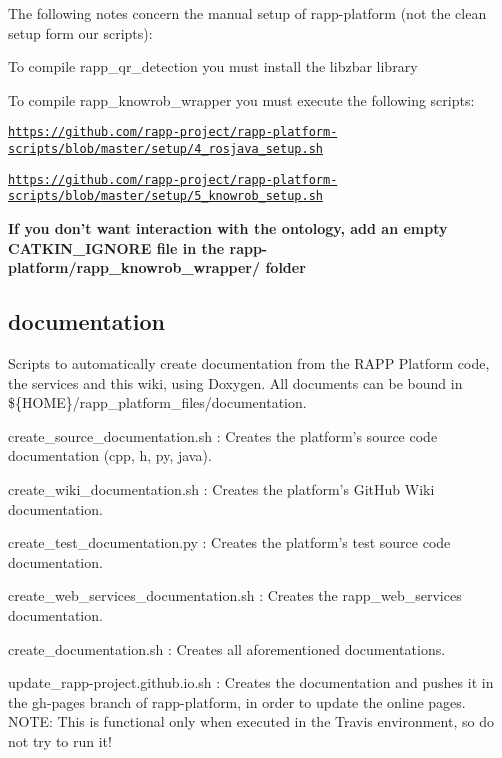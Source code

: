The following notes concern the manual setup of rapp-\/platform (not the clean setup form our scripts)\-:


\begin{DoxyItemize}
\item To compile {\ttfamily rapp\-\_\-qr\-\_\-detection} you must install the {\ttfamily libzbar} library
\item To compile {\ttfamily rapp\-\_\-knowrob\-\_\-wrapper} you must execute the following scripts\-:
\begin{DoxyItemize}
\item \href{https://github.com/rapp-project/rapp-platform-scripts/blob/master/setup/4_rosjava_setup.sh}{\tt https\-://github.\-com/rapp-\/project/rapp-\/platform-\/scripts/blob/master/setup/4\-\_\-rosjava\-\_\-setup.\-sh}
\item \href{https://github.com/rapp-project/rapp-platform-scripts/blob/master/setup/5_knowrob_setup.sh}{\tt https\-://github.\-com/rapp-\/project/rapp-\/platform-\/scripts/blob/master/setup/5\-\_\-knowrob\-\_\-setup.\-sh}
\item {\bfseries If you don't want interaction with the ontology, add an empty {\ttfamily C\-A\-T\-K\-I\-N\-\_\-\-I\-G\-N\-O\-R\-E} file in the {\ttfamily rapp-\/platform/rapp\-\_\-knowrob\-\_\-wrapper/} folder}
\end{DoxyItemize}
\end{DoxyItemize}

\subsection*{documentation}

Scripts to automatically create documentation from the R\-A\-P\-P Platform code, the services and this wiki, using Doxygen. All documents can be bound in {\ttfamily \$\{H\-O\-M\-E\}/rapp\-\_\-platform\-\_\-files/documentation}.


\begin{DoxyItemize}
\item {\ttfamily create\-\_\-source\-\_\-documentation.\-sh} \-: Creates the platform's source code documentation (cpp, h, py, java).
\item {\ttfamily create\-\_\-wiki\-\_\-documentation.\-sh} \-: Creates the platform's Git\-Hub Wiki documentation.
\item {\ttfamily create\-\_\-test\-\_\-documentation.\-py} \-: Creates the platform's test source code documentation.
\item {\ttfamily create\-\_\-web\-\_\-services\-\_\-documentation.\-sh} \-: Creates the rapp\-\_\-web\-\_\-services documentation.
\item {\ttfamily create\-\_\-documentation.\-sh} \-: Creates all aforementioned documentations.
\item {\ttfamily update\-\_\-rapp-\/project.\-github.\-io.\-sh} \-: Creates the documentation and pushes it in the {\ttfamily gh-\/pages} branch of rapp-\/platform, in order to update the online pages. N\-O\-T\-E\-: This is functional only when executed in the Travis environment, so do not try to run it!
\end{DoxyItemize}

